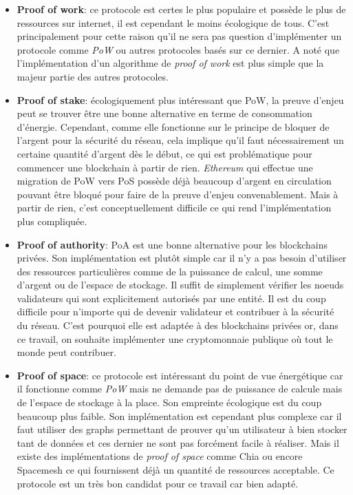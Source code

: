 \documentclass[../tb_report.tex]{subfiles}
\begin{document}
\begin{itemize}
    \item \textbf{Proof of work}: ce protocole est certes le plus populaire et possède le plus de ressources sur internet, il est cependant le moins écologique de tous. C'est principalement pour cette raison qu'il ne sera pas question d'implémenter un protocole comme \textit{PoW} ou autres protocoles basés sur ce dernier. A noté que l'implémentation d'un algorithme de \textit{proof of work} est plus simple que la majeur partie des autres protocoles.
    \item \textbf{Proof of stake}: écologiquement plus intéressant que PoW, la preuve d'enjeu peut se trouver être une bonne alternative en terme de consommation d'énergie. Cependant, comme elle fonctionne sur le principe de bloquer de l'argent pour la sécurité du réseau, cela implique qu'il faut nécessairement un certaine quantité d'argent dès le début, ce qui est problématique pour commencer une blockchain à partir de rien. \textit{Ethereum} qui effectue une migration de PoW vers PoS possède déjà beaucoup d'argent en circulation pouvant être bloqué pour faire de la preuve d'enjeu convenablement. Mais à partir de rien, c'est conceptuellement difficile ce qui rend l'implémentation plus compliquée.
    \item \textbf{Proof of authority}: PoA est une bonne alternative pour les blockchains privées. Son implémentation est plutôt simple car il n'y a pas besoin d'utiliser des ressources particulières comme de la puissance de calcul, une somme d'argent ou de l'espace de stockage. Il suffit de simplement vérifier les noeuds validateurs qui sont explicitement autorisés par une entité. Il est du coup difficile pour n'importe qui de devenir validateur et contribuer à la sécurité du réseau. C'est pourquoi elle est adaptée à des blockchains privées or, dans ce travail, on souhaite implémenter une cryptomonnaie publique où tout le monde peut contribuer.
    \item \textbf{Proof of space}: ce protocole est intéressant du point de vue énergétique car il fonctionne comme \textit{PoW} mais ne demande pas de puissance de calcule mais de l'espace de stockage à la place. Son empreinte écologique est du coup beaucoup plus faible. Son implémentation est cependant plus complexe car il faut utiliser des graphs permettant de prouver qu'un utilisateur à bien stocker tant de données et ces dernier ne sont pas forcément facile à réaliser. Mais il existe des implémentations de \textit{proof of space} comme Chia ou encore Spacemesh ce qui fournissent déjà un quantité de ressources acceptable. Ce protocole est un très bon candidat pour ce travail car bien adapté.

\end{itemize}
\end{document}

